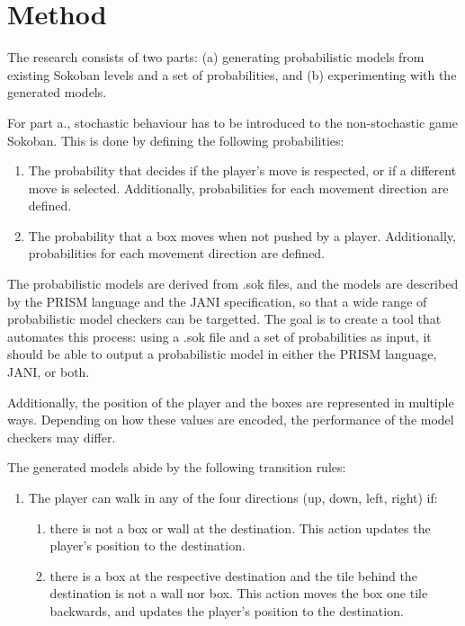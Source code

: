 \section{Method}
The research consists of two parts: (a) generating probabilistic models from existing Sokoban levels and a set of probabilities, and (b) experimenting with the generated models. 

For part a., stochastic behaviour has to be introduced to the non-stochastic game Sokoban. This is done by defining the following probabilities:
\begin{enumerate}
    \item The probability that decides if the player's move is respected, or if a different move is selected. Additionally, probabilities for each movement direction are defined.
    \item The probability that a box moves when not pushed by a player. Additionally, probabilities for each movement direction are defined.
\end{enumerate}

The probabilistic models are derived from .sok files, and the models are described by the PRISM language\cite{prism} and the JANI specification\cite{jani}, so that a wide range of probabilistic model checkers can be targetted. The goal is to create a tool that automates this process: using a .sok file and a set of probabilities as input, it should be able to output a probabilistic model in either the PRISM language, JANI, or both.

Additionally, the position of the player and the boxes are represented in multiple ways. Depending on how these values are encoded, the performance of the model checkers may differ.

The generated models abide by the following transition rules:
\begin{enumerate}
    \item The player can walk in any of the four directions (up, down, left, right) if:
    \begin{enumerate}
        \item there is not a box or wall at the destination. This action updates the player's position to the destination.
        \item there is a box at the respective destination and the tile behind the destination is not a wall nor box. This action moves the box one tile backwards, and updates the player's position to the destination.
    \end{enumerate}
\end{enumerate}

